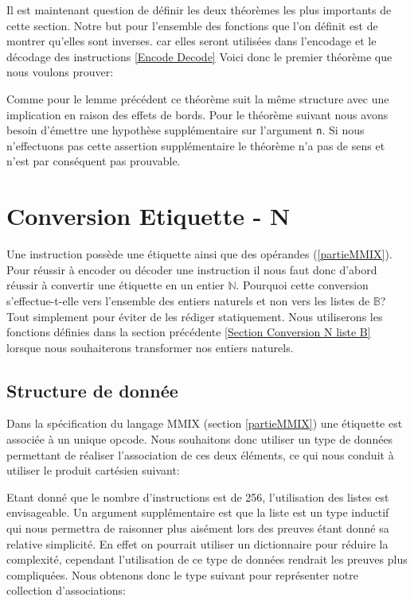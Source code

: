 \documentclass {article}
\newcommand{\codefrom}[3]
           {}
\theoremstyle{definition}
\theoremstyle{remark}
\newcommand{\fun}[1]{\lstinline!#1!}
\begin{document}
Il est maintenant question de définir les deux théorèmes les plus importants de
cette section. Notre but pour l'ensemble des fonctions que l'on définit est de
montrer qu'elles sont inverses.
car elles seront utilisées dans l'encodage et le décodage des instructions \ref{Encode Decode}
Voici donc le premier théorème que nous voulons prouver:

\codefrom{src}{binary}{nbitn}

Comme pour le lemme précédent ce théorème suit la même structure avec une implication en raison des effets
de bords.
Pour le théorème suivant nous avons besoin d'émettre une hypothèse supplémentaire sur l'argument
\fun{n}. Si nous n'effectuons pas cette assertion supplémentaire le
théorème n'a pas de sens et n'est par conséquent pas prouvable.

\codefrom{src}{binary}{bitnbit}





\section{Conversion Etiquette - N}
\label{partieOpcode}

Une instruction possède une étiquette ainsi que des opérandes (\ref{partieMMIX}).
Pour réussir à encoder ou décoder une instruction il nous faut donc d'abord
réussir à convertir une étiquette en un entier \ensuremath{\mathbb{N}}.
Pourquoi cette conversion s'effectue-t-elle vers l'ensemble des entiers naturels
et non vers les listes de \ensuremath{\mathbb{B}}? Tout simplement pour éviter
de les rédiger statiquement. Nous utiliserons les fonctions définies dans
la section précédente \ref{Section Conversion N liste B} lorsque nous souhaiterons transformer nos entiers naturels.

\subsection{Structure de donnée}
\label{Structure de donnee}
Dans la spécification du langage MMIX (section \ref{partieMMIX})
une étiquette est associée à un unique opcode. Nous souhaitons donc
utiliser un type de données permettant de réaliser l'association de ces deux éléments,
ce qui nous conduit à utiliser le produit cartésien suivant:
\codefrom{src}{association_list}{assoc}

Etant donné que le nombre
d'instructions est de 256, l'utilisation des listes est envisageable.
Un argument supplémentaire est que la liste
est un type inductif qui nous permettra de raisonner plus aisément
lors des preuves étant donné sa relative simplicité. En effet on pourrait utiliser
un dictionnaire pour réduire la complexité, cependant l'utilisation de ce 
type de données rendrait les preuves plus compliquées.
Nous obtenons donc le type suivant pour représenter notre collection d'associations:
\end{document}
